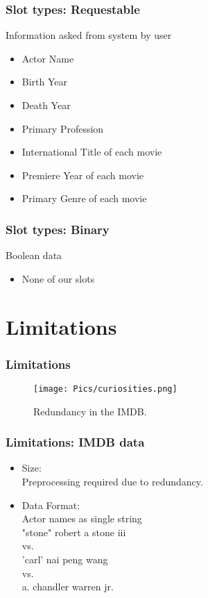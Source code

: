 \documentclass[11pt]{beamer}
\begin{document}
	\begin{frame}
		\frametitle{Slot types: Requestable}
		Information asked from system by user
		\begin{itemize}
			\item Actor Name
			\item Birth Year
			\item Death Year
			\item Primary Profession
			\item International Title of each movie
			\item Premiere Year of each movie
			\item Primary Genre of each movie
		\end{itemize}
	\end{frame}
	
	\begin{frame}
		\frametitle{Slot types: Binary}
		Boolean data\pause
		\begin{itemize}
			\item None of our slots
		\end{itemize}
	\end{frame}

\section{Limitations}
	\begin{frame}
		\frametitle{Limitations}
		\begin{figure}[ht]
			\centering
			\texttt{[image: Pics/curiosities.png]}
			\caption{Redundancy in the IMDB.}
			\label{pic:curiosities}
		\end{figure}
	\end{frame}	
	
	\begin{frame}
		\frametitle{Limitations: IMDB data}
		\begin{itemize}
			\item Size:\\
			Preprocessing required due to redundancy.\\ \pause
			\item Data Format:\\
			Actor names as single string\\ \pause
			"stone" robert a stone iii\\
			vs.\\
			'carl' nai peng wang\\
			vs.\\
			a. chandler warren jr.\\
		\end{itemize}
	\end{frame}
	
\end{document}
